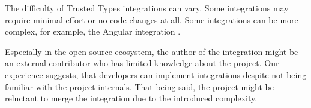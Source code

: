 The difficulty of Trusted Types integrations can vary. Some integrations may require minimal effort
or no code changes at all. Some integrations can be more complex, for example, the Angular
integration \cite{tt_web_framework_paper}.

Especially in the open-source ecosystem, the author of the integration might be an external
contributor who has limited knowledge about the project. Our experience suggests, that developers
can implement integrations despite not being familiar with the project internals. That being said,
the project might be reluctant to merge the integration due to the introduced complexity.
